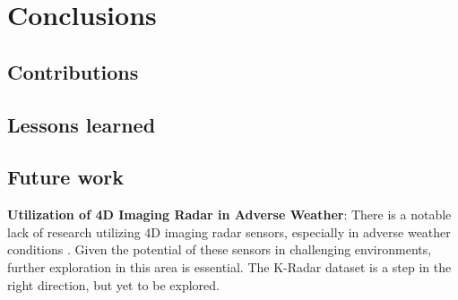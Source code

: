 \documentclass[report.tex]{subfiles}
\begin{document}
    \chapter{Conclusions}

    \section{Contributions}

    \section{Lessons learned}

    \section{Future work}

    \textbf{Utilization of 4D Imaging Radar in Adverse Weather}: There is a notable lack of research utilizing 4D imaging radar sensors, especially in adverse weather conditions \cite{Zhou2022May}. Given the potential of these sensors in challenging environments, further exploration in this area is essential. The K-Radar dataset \cite{Paek2022Jun} is a step in the right direction, but yet to be explored.
\end{document}
